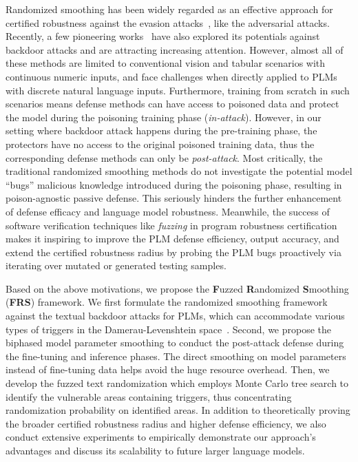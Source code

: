 Randomized smoothing has been widely regarded as an effective approach for certified robustness against the evasion attacks~\citep{cohen2019certified}, like the adversarial attacks. Recently, a few pioneering works~\citep{xie2021crfl, weber2023rab} have also explored its potentials against backdoor attacks and are attracting increasing attention.
However, almost all of these methods are limited to conventional vision and tabular scenarios with continuous numeric inputs, and face challenges when directly applied to PLMs with discrete natural language inputs. 
Furthermore, training from scratch in such scenarios means defense methods can have access to poisoned data and protect the model during the poisoning training phase (\textit{in-attack}). However, in our setting where backdoor attack happens during the pre-training phase, the protectors have no access to the original poisoned training data, thus the corresponding defense methods can only be \textit{post-attack}.
Most critically, the traditional randomized smoothing methods do not investigate the potential model ``bugs'' \textendash malicious knowledge introduced during the poisoning phase, resulting in poison-agnostic passive defense. This seriously hinders the further enhancement of defense efficacy and language model robustness. Meanwhile, the success of software verification techniques like \textit{fuzzing} in program robustness certification makes it inspiring to improve the PLM defense efficiency, output accuracy, and extend the certified robustness radius by probing the PLM bugs proactively via iterating over mutated or generated testing samples.

Based on the above motivations, we propose the \textbf{F}uzzed \textbf{R}andomized \textbf{S}moothing (\textbf{FRS}) framework. We first formulate the randomized smoothing framework against the textual backdoor attacks for PLMs, which can accommodate various types of triggers in the Damerau-Levenshtein space~\citep{damerau1964technique, levenshtein1966binary}. Second, we propose the biphased model parameter smoothing to conduct the post-attack defense during the fine-tuning and inference phases. The direct smoothing on model parameters instead of fine-tuning data helps avoid the huge resource overhead. Then, we develop the fuzzed text randomization which employs Monte Carlo tree search to identify the vulnerable areas containing triggers, thus concentrating randomization probability on identified areas. In addition to theoretically proving the broader certified robustness radius and higher defense efficiency, we also conduct extensive experiments to empirically demonstrate our approach's advantages and discuss its scalability to future larger language models.

